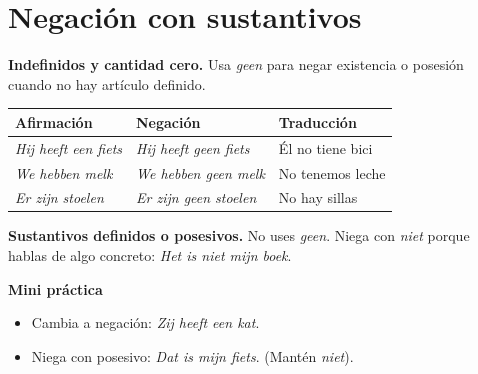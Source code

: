 \section{Negación con sustantivos}
\textbf{Indefinidos y cantidad cero.} Usa \textit{geen} para negar existencia o posesión cuando no hay artículo definido.

\begin{tabular}{@{}lll@{}}
\toprule
Afirmación & Negación & Traducción \\
\midrule
\textit{Hij heeft een fiets} & \textit{Hij heeft geen fiets} & Él no tiene bici \\
\textit{We hebben melk} & \textit{We hebben geen melk} & No tenemos leche \\
\textit{Er zijn stoelen} & \textit{Er zijn geen stoelen} & No hay sillas \\
\bottomrule
\end{tabular}

\textbf{Sustantivos definidos o posesivos.} No uses \textit{geen}. Niega con \textit{niet} porque hablas de algo concreto: \textit{Het is niet mijn boek}.

\textbf{Mini práctica}
\begin{itemize}[leftmargin=*]
  \item Cambia a negación: \textit{Zij heeft een kat}.
  \item Niega con posesivo: \textit{Dat is mijn fiets}. (Mantén \textit{niet}).
\end{itemize}
